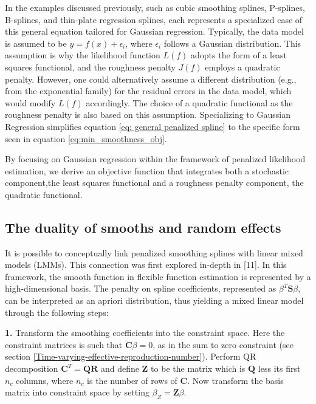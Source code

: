 \documentclass[
11pt, %
oneside, %
english, %
singlespacing, %
]{macthesis} %
\begin{document}
In the examples discussed previously, such as cubic smoothing splines, P-splines, B-splines, and thin-plate regression splines, each represents a specialized case of this general equation tailored for Gaussian regression. Typically, the data model is assumed to be \(y = f(x) + \epsilon_i\), where \(\epsilon_i\) follows a Gaussian distribution. This assumption is why the likelihood function \(L(f)\) adopts the form of a least squares functional, and the roughness penalty \(J(f)\) employs a quadratic penalty. However, one could alternatively assume a different distribution (e.g., from the exponential family) for the residual errors in the data model, which would modify \(L(f)\) accordingly. The choice of a quadratic functional as the roughness penalty is also based on this assumption. Specializing to Gaussian Regression simplifies equation \ref{eq: general penalized spline} to the specific form seen in equation \ref{eq:min_smoothness_obj}.

By focusing on Gaussian regression within the framework of penalized likelihood estimation, we derive an objective function that integrates both a stochastic component,the least squares functional and a roughness penalty component, the quadratic functional.

\subsection{The duality of smooths and random effects}\label{The-duality-of-smooths-and-random-effects}

It is possible to conceptually link penalized smoothing splines with linear mixed models (LMMs). This connection was first explored in-depth in {[}11{]}. In this framework, the smooth function in flexible function estimation is represented by a high-dimensional basis. The penalty on spline coefficients, represented as \(\beta^T \mathbf{S} \beta\), can be interpreted as an apriori distribution, thus yielding a mixed linear model through the following steps:

\textbf{1.} Transform the smoothing coefficients into the constraint space. Here the constraint matrices is such that \(\mathbf{C}\beta = 0\), as in the sum to zero constraint (see
section \ref{Time-varying-effective-reproduction-number}). Perform QR decomposition \(\mathbf{C}^T = \mathbf{QR}\) and define \(\mathbf{Z}\) to be the matrix which is \(\mathbf{Q}\) less its first \(n_c\) columns, where \(n_c\) is the number of rows of \(\mathbf{C}\). Now transform the basis matrix into constraint space by setting \(\beta_Z = \mathbf{Z}\beta\).
\end{document}
